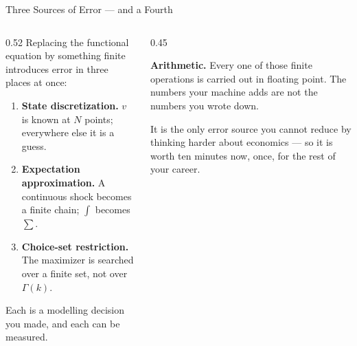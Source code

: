 \begin{frame}{Three Sources of Error --- and a Fourth}
\begin{columns}[T]
\begin{column}{0.52\textwidth}
\small
Replacing the functional equation by something finite introduces error in three places at once:
\begin{enumerate}\footnotesize
  \item \textbf{State discretization.} $v$ is known at $N$ points; everywhere else it is a guess.
  \item \textbf{Expectation approximation.} A continuous shock becomes a finite chain; $\int$ becomes $\sum$.
  \item \textbf{Choice-set restriction.} The maximizer is searched over a finite set, not over $\Gamma(k)$.
\end{enumerate}
\medskip
Each is a modelling decision you made, and each can be measured.
\end{column}
\begin{column}{0.45\textwidth}
\begin{cautionbox}[title=\textbf{The fourth one is not in the theory}]\footnotesize
\textbf{Arithmetic.} Every one of those finite operations is carried out in floating point. The numbers your machine adds are not the numbers you wrote down.
\end{cautionbox}
\medskip
\begin{examplebox}\footnotesize
It is the only error source you cannot reduce by thinking harder about economics --- so it is worth ten minutes now, once, for the rest of your career.
\end{examplebox}
\end{column}
\end{columns}
\vspace{1mm}
\end{frame}

